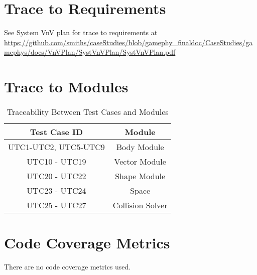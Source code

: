 \documentclass[12pt, titlepage]{article}
\begin{document}
\section{Trace to Requirements}
See System VnV plan for trace to requirements at \url{https://github.com/smiths/caseStudies/blob/gamephy_finaldoc/CaseStudies/gamephys/docs/VnVPlan/SystVnVPlan/SystVnVPlan.pdf}
\newpage	
\section{Trace to Modules}		

\begin{table} [h!]
	
	\centering
	
	\begin{tabular}{|c|c|}
		
		\hline	
		
		\textbf{Test Case ID} & \textbf{Module}\\
		
		\hline 
		
		
		UTC1-UTC2, UTC5-UTC9& Body Module\\ \hline
		
		UTC10 - UTC19& Vector  Module\\ \hline
		
		UTC20 - UTC22&  Shape Module\\ \hline
		
		UTC23 - UTC24& Space\\ \hline
		
		UTC25 - UTC27 & Collision Solver\\ \hline
		
	\end{tabular}
	
	\caption{Traceability Between Test Cases and Modules}
	
	\label{Table:Traceability} 
	
\end{table}

\section{Code Coverage Metrics}
There are no code coverage metrics used.



\end{document}
